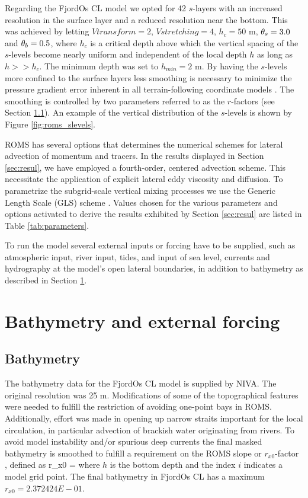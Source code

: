 Regarding the FjordOs CL model we opted for 42 $s$-layers with an increased resolution in the surface layer and a reduced resolution near the bottom. This was achieved by letting $Vtransform=2$, $Vstretching=4$, $h_c = 50$ m, $\theta_s = 3.0$ and $\theta_b = 0.5$, where $h_c$ is a critical depth above which the vertical spacing of the $s$-levels become nearly uniform and independent of the local depth $h$ as long as $h >> h_c$. The minimum depth was set to $h_{min}=2$ m. By having the $s$-levels more confined to the surface layers less smoothing is necessary to minimize the pressure gradient error inherent in all terrain-following coordinate models \citep{haney:1991}. The smoothing is controlled by two parameters referred to as the $r$-factors (see Section \ref{subsec:bathy}). An example of the vertical distribution of the $s$-levels is shown by Figure \ref{fig:roms_slevels}.


ROMS has several options that determines the numerical schemes for lateral advection of momentum and tracers. In the results displayed in Section \ref{sec:resul}, we have employed a fourth-order, centered advection scheme. This necessitate the application of explicit lateral eddy viscosity and diffusion. To parametrize the subgrid-scale vertical mixing processes we use the Generic Length Scale (GLS) scheme  \citep{umlau:burch:2003}. Values chosen for the various parameters and options activated to derive the results exhibited by Section \ref{sec:resul} are listed in Table \ref{tab:parameters}. 


To run the model several external inputs or forcing have to be supplied, such as atmospheric input, river input, tides, and input of sea level, currents and hydrography at the model's open lateral boundaries, in addition to bathymetry as described in Section \ref{sec:forcing}.   

\clearpage
\section{Bathymetry and external forcing}
\label{sec:forcing}
\subsection{Bathymetry}
\label{subsec:bathy}
The bathymetry data for the FjordOs CL model is supplied by NIVA. The original resolution was 25 m. Modifications of some of the topographical features were needed to fulfill the restriction of avoiding one-point bays in ROMS. Additionally, effort was made in opening up narrow straits important for the local circulation, in particular advection of brackish water originating from rivers. To avoid model instability and/or spurious deep currents the final masked bathymetry is smoothed to fulfill a requirement on the ROMS slope or $r_{x0}$-factor \citep{beckm:haidv:1993}, defined as
\be
 r_{x0} = 
\ee
where $h$ is the bottom depth and the index $i$ indicates a model grid point. The final bathymetry in FjordOs CL has a maximum $r_{x0} = 2.372424E-01$.

